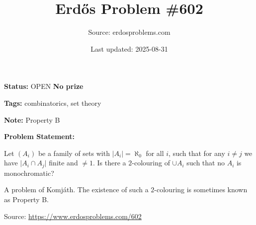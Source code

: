 \documentclass{article}
\title{Erd\H{o}s Problem \#602}
\date{Last updated: 2025-08-31}
\author{Source: erdosproblems.com}
\begin{document}
\maketitle

\noindent\textbf{Status:} OPEN \quad \textbf{No prize}

\noindent\textbf{Tags:} combinatorics, set theory

\medskip
\noindent\textbf{Note:} Property B

\medskip

\noindent\textbf{Problem Statement:}

Let $(A_i)$ be a family of sets with $\lvert A_i\rvert=\aleph_0$ for all $i$, such that for any $i\neq j$ we have $\lvert A_i\cap A_j\rvert$ finite and $\neq 1$. Is there a $2$-colouring of $\cup A_i$ such that no $A_i$ is monochromatic?




A problem of Komj\'{a}th. The existence of such a $2$-colouring is sometimes known as Property B.


\bigskip
\noindent\small{Source: \url{https://www.erdosproblems.com/602}}
\end{document}
